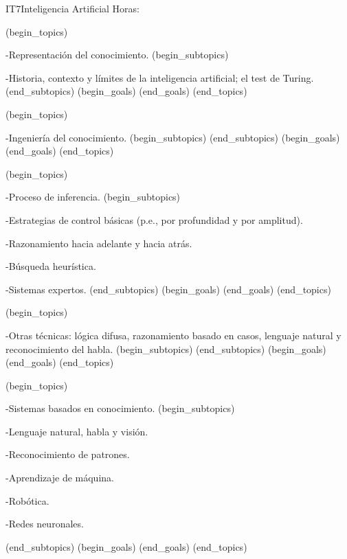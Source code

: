 \begin{BKL2}{IT7}{Inteligencia Artificial}
Horas:
 
(begin_topics)

-Representación del conocimiento.
(begin_subtopics)

-Historia, contexto y lí­mites de la inteligencia artificial; el test de Turing.
(end_subtopics)
(begin_goals)
(end_goals)
(end_topics)

 

(begin_topics)

-Ingenierí­a del conocimiento.
(begin_subtopics)
(end_subtopics)
(begin_goals)
(end_goals)
(end_topics)

 

(begin_topics)

-Proceso de inferencia.
(begin_subtopics)

-Estrategias de control básicas (p.e., por profundidad y por amplitud).

-Razonamiento hacia adelante y hacia atrás.

-Búsqueda heurí­stica.

-Sistemas expertos.
(end_subtopics)
(begin_goals)
(end_goals)
(end_topics)

 

(begin_topics)

-Otras técnicas: lógica difusa, razonamiento basado en casos, lenguaje natural y reconocimiento del habla.
(begin_subtopics)
(end_subtopics)
(begin_goals)
(end_goals)
(end_topics)

 

(begin_topics)

-Sistemas basados en conocimiento.
(begin_subtopics)

-Lenguaje natural, habla y visión.

-Reconocimiento de patrones.

-Aprendizaje de máquina.

-Robótica.

-Redes neuronales.

(end_subtopics)
(begin_goals)
(end_goals)
(end_topics)

\end{BKL2}



